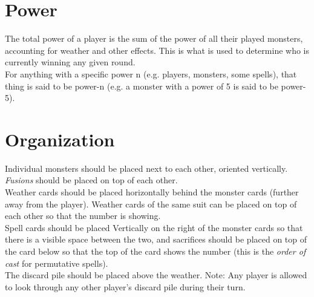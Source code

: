 \documentclass[letterpaper, reqno, 11pt]{article}
\begin{document}
\section*{Power}
\indent The total power of a player is the sum of the power of all their played monsters, accounting for weather and other effects. This is what is used to determine who is currently winning any given round.\\
\indent For anything with a specific power n (e.g. players, monsters, some spells), that thing is said to be power-n (e.g. a monster with a power of 5 is said to be power-5).

\section*{Organization}
\indent Individual monsters should be placed next to each other, oriented vertically. \textit{Fusions} should be placed on top of each other.\\
Weather cards should be placed horizontally behind the monster cards (further away from the player). Weather cards of the same suit can be placed on top of each other so that the number is showing.\\
Spell cards should be placed Vertically on the right of the monster cards so that there is a visible space between the two, and sacrifices should be placed on top of the card below so that the top of the card shows the number (this is the \textit{order of cast} for permutative spells).\\
\indent The discard pile should be placed above the weather. Note: Any player is allowed to look through any other player's discard pile during their turn.
\end{document}
